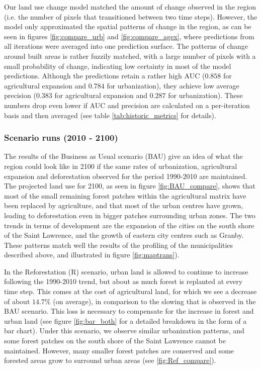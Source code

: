Our land use change model matched the amount of change observed in the region (i.e. the number of pixels that transitioned between two time steps). However, the  model only approximated the spatial patterns of change in the region, as can be seen in figures \ref{fig:compare_urb} and \ref{fig:compare_agex}, where predictions from all iterations were averaged into one prediction surface. The patterns of change around built areas is rather fuzzily matched, with a large number of pixels with a small probability of change, indicating low certainty in most of the model predictions. Although the predictions retain a rather high AUC ($0.858$ for agricultural expansion and $0.784$ for urbanization), they achieve low average precision ($0.383$ for agricultural expansion and $0.287$ for urbanization). These numbers drop even lower if AUC and precision are calculated on a per-iteration basis and then averaged (see table \ref{tab:historic_metrics} for details).\\

\subsubsection*{Scenario runs (2010 - 2100)} 

The results of the Business as Usual scenario (BAU) give an idea of what the region could look like in 2100 if the same rates of urbanization, agricultural expansion and deforestation observed for the period 1990-2010 are maintained. The projected land use for 2100, as seen in figure \ref{fig:BAU_compare}, shows that most of the small remaining forest patches within the agricultural matrix have been replaced by agriculture, and that most of the urban centres have grown, leading to deforestation even in bigger patches surrounding urban zones. The two trends in terms of development are the expansion of the cities on the south shore of the Saint Lawrence, and the growth of eastern city centres such as Granby.  These patterns match well the results of the profiling of the municipalities described above, and illustrated in figure \ref{fig:maptrans}).

In the Reforestation (R) scenario, urban land is allowed to continue to increase following the 1990-2010 trend, but about as much forest is replanted at every time step. This comes at the cost of agricultural land, for which we see a decrease of about $14.7\%$ (on average), in comparison to the slowing that is observed in the BAU scenario. This loss is necessary to compensate for the increase in forest and urban land (see figure \ref{fig:bar_both} for a detailed breakdown in the form of a bar chart). Under this scenario, we observe similar urbanization patterns, and some forest patches on the south shore of the Saint Lawrence cannot be maintained. However, many smaller forest patches are conserved and some forested areas grow to surround urban areas (see \ref{fig:Ref_compare}).

